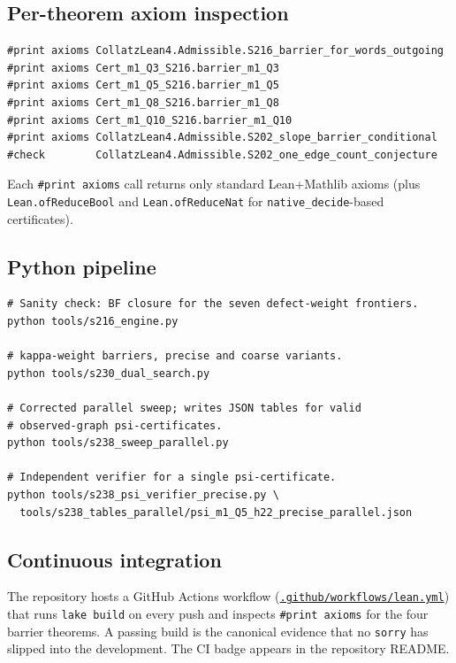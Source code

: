 \documentclass[11pt,a4paper]{article}
\theoremstyle{plain}
\theoremstyle{definition}
\begin{document}
\subsection*{Per-theorem axiom inspection}

\begin{lstlisting}
#print axioms CollatzLean4.Admissible.S216_barrier_for_words_outgoing
#print axioms Cert_m1_Q3_S216.barrier_m1_Q3
#print axioms Cert_m1_Q5_S216.barrier_m1_Q5
#print axioms Cert_m1_Q8_S216.barrier_m1_Q8
#print axioms Cert_m1_Q10_S216.barrier_m1_Q10
#print axioms CollatzLean4.Admissible.S202_slope_barrier_conditional
#check        CollatzLean4.Admissible.S202_one_edge_count_conjecture
\end{lstlisting}

Each \texttt{\#print axioms} call returns only standard
Lean+Mathlib axioms (plus \texttt{Lean.ofReduceBool} and
\texttt{Lean.ofReduceNat} for \texttt{native\_decide}-based
certificates).

\subsection*{Python pipeline}

\begin{lstlisting}
# Sanity check: BF closure for the seven defect-weight frontiers.
python tools/s216_engine.py

# kappa-weight barriers, precise and coarse variants.
python tools/s230_dual_search.py

# Corrected parallel sweep; writes JSON tables for valid
# observed-graph psi-certificates.
python tools/s238_sweep_parallel.py

# Independent verifier for a single psi-certificate.
python tools/s238_psi_verifier_precise.py \
  tools/s238_tables_parallel/psi_m1_Q5_h22_precise_parallel.json
\end{lstlisting}

\subsection*{Continuous integration}

The repository hosts a GitHub Actions workflow
(\href{run:.github/workflows/lean.yml}%
      {\texttt{.github/workflows/lean.yml}})
that runs \texttt{lake build} on every push and inspects
\texttt{\#print axioms} for the four barrier theorems. A passing
build is the canonical evidence that no \texttt{sorry} has slipped
into the development. The CI badge appears in the repository
README.
\end{document}
